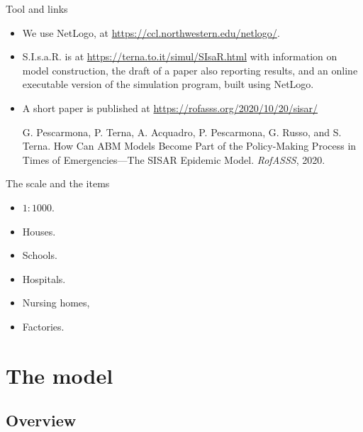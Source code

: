 \documentclass[8pt]{beamer}
\begin{document}
\begin{frame}{Tool and links}

  \begin{itemize}

\item We use NetLogo, at \url{https://ccl.northwestern.edu/netlogo/}.

 \item
 
S.I.s.a.R. is at \url{https://terna.to.it/simul/SIsaR.html} with information on model construction, the draft of a paper also reporting results, and an online executable version of the simulation program, built using NetLogo.

 \item
 A short paper is published at \url{https://rofasss.org/2020/10/20/sisar/}
 
 G. Pescarmona, P. Terna, A. Acquadro, P. Pescarmona, G. Russo, and S. Terna. How Can ABM Models Become Part of the Policy-Making Process in Times of Emergencies---The SISAR Epidemic Model. \emph{RofASSS}, 2020.

 \end{itemize}
\end{frame}

\begin{frame}{The scale and the items}

\begin{itemize}

\item $1:1000$.

\bigskip

\item Houses.
\item Schools.
\item Hospitals.
\item Nursing homes,
\item Factories.

\end{itemize}

\end{frame}
\section{The model}

\subsection{Overview}
\end{document}
